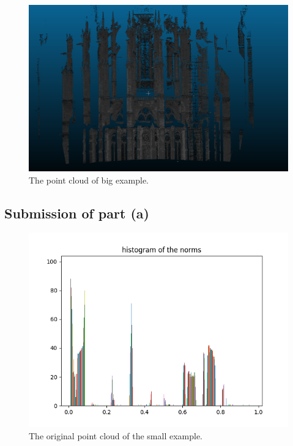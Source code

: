 \documentclass[a4paper,12pt]{article}
\begin{document}
  \begin{figure}[H]
  \begin{center}
      \includegraphics[scale=0.4]{big_example.png}
\end{center}
\caption{The point cloud of big example.}
 \label{fig:big}
 \end{figure}
\subsection{Submission of part (a)}



 \begin{figure}[H]
  \begin{center}
      \includegraphics[scale=0.6]{hist_of_abs_norm.png}
\end{center}
\caption{The original point cloud of the small example.}
 \label{fig:sml_origin}
 \end{figure}
 
\end{document}
